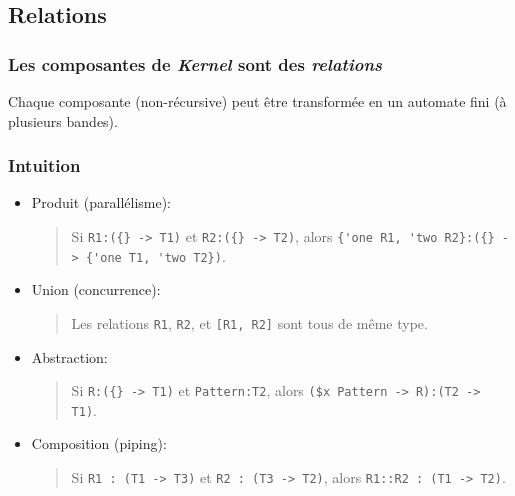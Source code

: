 \documentclass{beamer}
\newcommand{\Kernel}{\textit{Kernel}}
\begin{document}
\subsection{Relations}
\begin{frame}
  \frametitle{Les composantes de \Kernel{} sont des \emph{relations}}
  \begin{center}
    
  \end{center}
  Chaque composante (non-récursive) peut être transformée en un automate
  fini (à plusieurs bandes).
\end{frame}


\begin{frame}[fragile]
  \frametitle{Intuition}
  \begin{itemize}
  \item Produit (parallélisme): \fg{}

    \begin{quote}\footnotesize
      Si {\color{blue}\verb+R1:({} -> T1)+} et  {\color{blue}\verb+R2:({} -> T2)+}, alors   
      {\color{blue}\verb+{'one R1, 'two R2}:({} -> {'one T1, 'two T2})+}.
    \end{quote}
  \item Union (concurrence):   \og{}{\color{blue}\verb+[R1, R2]+}\fg{}

    \begin{quote}\footnotesize
      Les relations {\color{blue}\verb+R1+}, {\color{blue}\verb+R2+}, et
      {\color{blue}\verb+[R1, R2]+} sont tous de même type.
    \end{quote}

  \item Abstraction: \fg{}

    \begin{quote}\footnotesize
      Si {\color{blue}\verb+R:({} -> T1)+} et
      {\color{blue}\verb+Pattern:T2+}, alors
      {\color{blue}\verb+($x Pattern -> R):(T2 -> T1)+}.
    \end{quote}
   \item Composition (piping): \fg{}

    \begin{quote}\footnotesize
      Si {\color{blue}\verb+R1 : (T1 -> T3)+} et
      {\color{blue}\verb+R2 : (T3 -> T2)+}, alors
      {\color{blue}\verb+R1::R2 : (T1 -> T2)+}.
    \end{quote}
  
  \end{itemize}
\end{frame}
\end{document}
